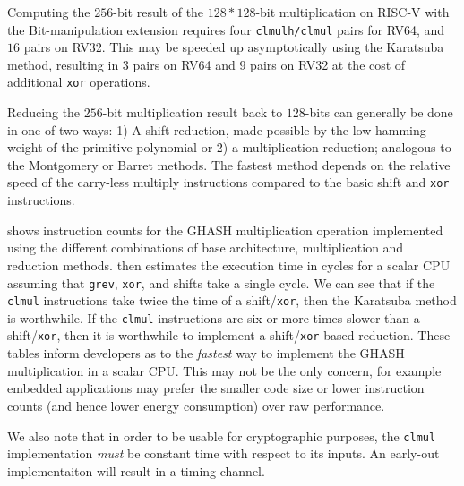 Computing the $256$-bit result of the $128*128$-bit multiplication
on RISC-V with the Bit-manipulation extension requires
four {\tt clmulh/clmul} pairs for RV64,
and $16$ pairs on RV32.
This may be speeded up asymptotically using the Karatsuba method,
resulting in $3$ pairs on RV64 and $9$ pairs on RV32
at the cost of additional {\tt xor} operations.

Reducing the $256$-bit multiplication result back to $128$-bits
can generally be done in one of two ways:
1) A shift reduction, made possible by the low hamming weight of
the primitive polynomial
or
2) a multiplication reduction; analogous to the Montgomery or
Barret methods.
The fastest method depends on the relative speed of
the carry-less multiply instructions compared to the basic
shift and {\tt xor} instructions.

 shows instruction counts for the GHASH multiplication
operation implemented using the different combinations of base architecture,
multiplication and reduction methods.
 then estimates the execution time in cycles
for a scalar CPU assuming that {\tt grev}, {\tt xor}, and shifts take a
single cycle.
We can see that if the {\tt clmul} instructions take twice the time
of a shift/{\tt xor}, then the Karatsuba method is worthwhile.
If the {\tt clmul} instructions are six or more times slower than
a shift/{\tt xor}, then it is worthwhile to implement a shift/{\tt xor}
based reduction.
These tables inform developers as to the {\em fastest} way to implement
the GHASH multiplication in a scalar CPU.
This may not be the only concern, for example embedded applications may
prefer the smaller code size or lower instruction counts (and hence
lower energy consumption) over raw performance.

We also note that in order to be usable for cryptographic purposes, the
{\tt clmul} implementation {\em must} be constant time with respect
to its inputs.
An early-out implementaiton will result in a timing channel.

